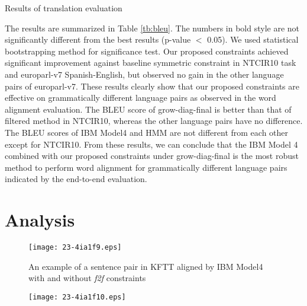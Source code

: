 \documentclass[english]{jnlp_1.4}
\begin{document}
\begin{table}[b]
\caption{Results of translation evaluation}
\label{tb:bleu}

\end{table}

The results are summarized in Table \ref{tb:bleu}.
The numbers in bold style are not significantly different from the best results (p-value $<$ 0.05).
We used statistical bootstrapping method \cite{koehn:2004:EMNLP} for significance test.
Our proposed constraints achieved significant improvement against baseline symmetric constraint in NTCIR10 task and europarl-v7 Spanish-English, but observed no gain in the other language pairs of europarl-v7.
These results clearly show that our proposed constraints are effective on grammatically different language pairs as observed in the word alignment evaluation.
The BLEU score of grow-diag-final is better than that of filtered method in NTCIR10, whereas the other language pairs have no difference.
The BLEU scores of IBM Model4 and HMM are not different from each other except for NTCIR10.
From these results, we can conclude that the IBM Model 4 combined with our proposed constraints under grow-diag-final is the most robust method to perform word alignment for grammatically different language pairs indicated by the end-to-end evaluation.


\section{Analysis}
\label{sec:analysis}

\begin{figure}[b]
\begin{center}
\texttt{[image: 23-4ia1f9.eps]}
\end{center}
  \caption{An example of a sentence pair in KFTT aligned by IBM Model4 with and without \textit{f2f} constraints}
  \label{fig:alignment1}
\end{figure}

\begin{figure}[t]
\begin{center}
\texttt{[image: 23-4ia1f10.eps]}
\end{center}
  \label{fig:alignment2}
\vspace{-1\Cvs}
\end{figure}
\end{document}
